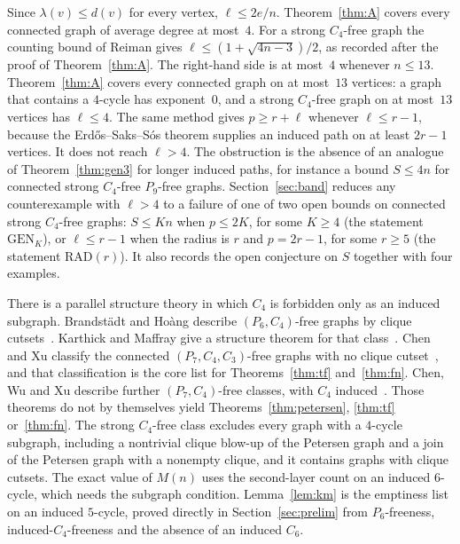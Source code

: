 \documentclass[ASNA]{USG}
\theoremstyle{WBstyletwo}
\numberwithin{equation}{section}
\newcommand{\lr}{\ell}
\newcommand{\pp}{p}
\newcommand{\GEN}{\mathrm{GEN}}
\newcommand{\RAD}{\mathrm{RAD}}
\begin{document}
Since $\lambda(v)\le d(v)$ for every vertex, $\lr\le 2e/n$. Theorem~\ref{thm:A} covers every connected graph of average degree at most~$4$. For a strong $C_4$-free graph the counting bound of Reiman gives $\lr\le(1+\sqrt{4n-3})/2$, as recorded after the proof of Theorem~\ref{thm:A}. The right-hand side is at most~$4$ whenever $n\le 13$. Theorem~\ref{thm:A} covers every connected graph on at most~$13$ vertices: a graph that contains a $4$-cycle has exponent~$0$, and a strong $C_4$-free graph on at most~$13$ vertices has $\lr\le 4$. The same method gives $\pp\ge r+\lr$ whenever $\lr\le r-1$, because the Erd\H{o}s--Saks--S\'os theorem supplies an induced path on at least $2r-1$ vertices. It does not reach $\lr>4$. The obstruction is the absence of an analogue of Theorem~\ref{thm:gen3} for longer induced paths, for instance a bound $S\le 4n$ for connected strong $C_4$-free $P_9$-free graphs. Section~\ref{sec:band} reduces any counterexample with $\lr>4$ to a failure of one of two open bounds on connected strong $C_4$-free graphs: $S\le Kn$ when $\pp\le 2K$, for some $K\ge 4$ (the statement $\GEN_K$), or $\lr\le r-1$ when the radius is $r$ and $\pp=2r-1$, for some $r\ge 5$ (the statement $\RAD(r)$). It also records the open conjecture on $S$ together with four examples.

There is a parallel structure theory in which $C_4$ is forbidden only as an induced subgraph. Brandst\"adt and Ho\`ang describe $(P_6,C_4)$-free graphs by clique cutsets~\cite{bh}. Karthick and Maffray give a structure theorem for that class~\cite{km}. Chen and Xu classify the connected $(P_7,C_4,C_3)$-free graphs with no clique cutset~\cite{chenxu}, and that classification is the core list for Theorems~\ref{thm:tf} and~\ref{thm:fn}. Chen, Wu and Xu describe further $(P_7,C_4)$-free classes, with $C_4$ induced~\cite{cwx}. Those theorems do not by themselves yield Theorems~\ref{thm:petersen}, \ref{thm:tf} or~\ref{thm:fn}. The strong $C_4$-free class excludes every graph with a $4$-cycle subgraph, including a nontrivial clique blow-up of the Petersen graph and a join of the Petersen graph with a nonempty clique, and it contains graphs with clique cutsets. The exact value of $M(n)$ uses the second-layer count on an induced $6$-cycle, which needs the subgraph condition. Lemma~\ref{lem:km} is the emptiness list on an induced $5$-cycle, proved directly in Section~\ref{sec:prelim} from $P_6$-freeness, induced-$C_4$-freeness and the absence of an induced $C_6$.
\end{document}
